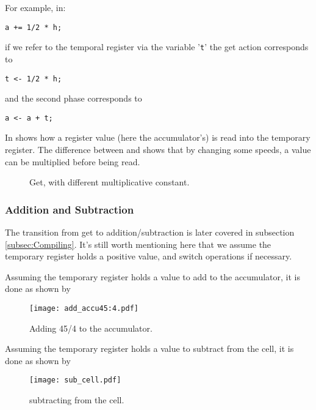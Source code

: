 For example, in:
\begin{verbatim}
a += 1/2 * h;
\end{verbatim}
if we refer to the temporal register via the variable '\texttt{t}' the get action corresponds to
\begin{verbatim}
t <- 1/2 * h;
\end{verbatim}
and the second phase corresponds to
\begin{verbatim}
a <- a + t;
\end{verbatim}

In  shows how a register value (here the accumulator's) is read into the temporary register. The difference between  and  shows that by changing some speeds, a value can be multiplied before being read.

\begin{figure}[hbt]
	\centering
	\small%
	\caption{Get, with different multiplicative constant.}
	\label{fig:get:accu}
\end{figure}


\subsubsection{Addition and Subtraction}
The transition from get to addition/subtraction is later covered in subsection \ref{subsec:Compiling}.
It's still worth mentioning here that we assume the temporary register holds a positive value, and switch operations if necessary.

Assuming the temporary register holds a value to add to the accumulator, it is done as shown by 
\begin{figure}[hbt]
	\centering
	\small%
	\texttt{[image: add\_accu45:4.pdf]}%
	\caption{Adding 45/4 to the accumulator.}
	\label{fig:add:accu:45:4}
\end{figure}

Assuming the temporary register holds a value to subtract from the cell, it is done as shown by 
\begin{figure}[hbt]
	\centering
	\small%
	\texttt{[image: sub\_cell.pdf]}%
	\caption{subtracting from the cell.}
	\label{fig:sub:cell}
\end{figure}

